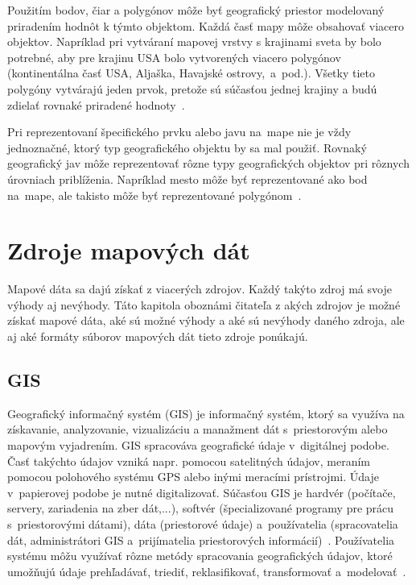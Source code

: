 Použitím bodov, čiar a polygónov môže byť geografický priestor modelovaný priradením hodnôt k týmto objektom. Každá časť mapy môže obsahovať viacero objektov. Napríklad pri vytváraní mapovej vrstvy s krajinami sveta by bolo potrebné, aby pre krajinu USA bolo vytvorených viacero polygónov (kontinentálna časť USA, Aljaška, Havajské ostrovy,~a~pod.). Všetky tieto polygóny vytvárajú jeden prvok, pretože sú súčasťou jednej krajiny a budú zdielať rovnaké priradené hodnoty~\cite{introductiontogis}.

Pri reprezentovaní špecifického prvku alebo javu na~mape nie je vždy jednoznačné, ktorý typ geografického objektu by sa mal použiť. Rovnaký geografický jav môže reprezentovať rôzne typy geografických objektov pri rôznych úrovniach priblíženia. Napríklad mesto môže byť reprezentované ako bod na~mape, ale takisto môže byť reprezentované polygónom~\cite{geographicobjects}.



\chapter{Zdroje mapových dát}
\label{chap:source-map-data}
Mapové dáta sa dajú získať z viacerých zdrojov. Každý takýto zdroj má svoje výhody aj nevýhody. Táto kapitola oboznámi čitateľa z akých zdrojov je možné získať mapové dáta, aké sú možné výhody a aké sú nevýhody daného zdroja, ale aj aké formáty súborov mapových dát tieto zdroje ponúkajú. 


\section{GIS}
Geografický informačný systém (GIS) je informačný systém, ktorý sa využíva na získavanie, analyzovanie, vizualizáciu a manažment dát s~priestorovým alebo mapovým vyjadrením. GIS spracováva geografické údaje v~digitálnej podobe. Časť takýchto údajov vzniká napr. pomocou satelitných údajov, meraním pomocou polohového systému GPS alebo inými meracími prístrojmi. Údaje v~papierovej podobe je nutné digitalizovať. Súčasťou GIS je hardvér (počítače, servery, zariadenia na zber dát,...), softvér (špecializované programy pre prácu s~priestorovými dátami), dáta (priestorové údaje) a~používatelia (spracovatelia dát, administrátori GIS a~prijímatelia priestorových informácií)~\cite{introductiontogis}. Používatelia systému môžu využívať rôzne metódy spracovania geografických údajov, ktoré umožňujú údaje prehľadávať, triediť, reklasifikovať, transformovať a~modelovať~\cite{hofierka2003gis}.

